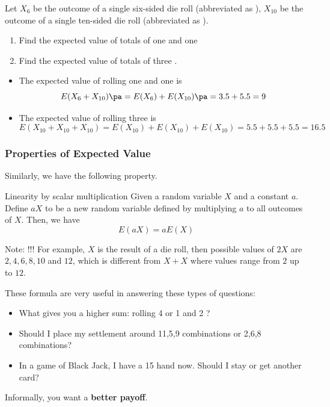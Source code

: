 \begin{frame}[t]
\begin{ex}
Let $X_6$ be the outcome of a single six-sided die roll (abbreviated as ), $X_{10}$ be the outcome of a single ten-sided die roll (abbreviated as ).
\begin{enumerate}
\item Find the expected value of totals of one  and one 
\item Find the expected value of totals of three .
\end{enumerate}
\end{ex}
\begin{sol}
\begin{itemize}
\item The expected value of rolling one  and one  is \pa
\[E(X_6 +X_{10}) \pa = E(X_6) + E(X_{10}) \pa = 3.5 + 5.5 = 9\]
\item The expected value of rolling three  is
\[E(X_{10} + X_{10} + X_{10}) = E(X_{10}) + E(X_{10}) + E(X_{10}) = 5.5 + 5.5 + 5.5 = 16.5\]
\end{itemize}
\end{sol}
\end{frame}

\begin{frame}
\frametitle{Properties of Expected Value}
Similarly, we have the following property.
\begin{thm}{Linearity by scalar multiplication}{}
Given a random variable $X$ and a constant $a$. Define $aX$ to be a new random variable defined by multiplying $a$ to all outcomes of $X$. Then, we have
\[E(aX) = aE(X)\]
\end{thm}
Note:  !!! For example, $X$ is the result of a die roll, then possible values of $2X$ are $2,4,6,8,10$ and $12$, which is different from $X+X$ where values range from $2$ up to $12$.
\end{frame}

\begin{frame}
These formula are very useful in answering these types of questions: \pa
\begin{itemize}
\item What gives you a higher sum: rolling 4  or 1  and 2 ? \pa
\item Should I place my settlement around 11,5,9 combinations or 2,6,8 combinations? \pa
\item In a game of Black Jack, I have a 15 hand now. Should I stay or get another card? \pa
\end{itemize}
Informally, you want a \textbf{better payoff}.
\end{frame}


